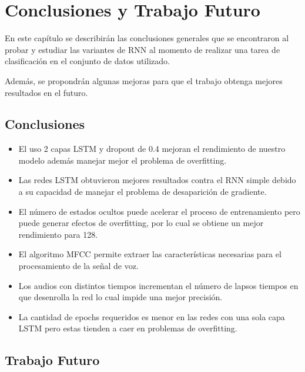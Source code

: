 \chapter{Conclusiones y Trabajo Futuro}
En este capítulo se describirán las conclusiones generales que se encontraron al probar y estudiar las variantes de RNN al momento de realizar una tarea de clasificación en el conjunto de datos utilizado.

Además, se propondrán algunas mejoras para que el trabajo obtenga mejores
resultados en el futuro.

\section{Conclusiones}

\begin{itemize}
	\item El uso 2 capas LSTM y dropout de 0.4 mejoran el rendimiento de nuestro modelo además manejar mejor el problema de overfitting.
	\item Las redes LSTM obtuvieron mejores resultados contra el RNN simple debido a su capacidad de manejar el problema de desaparición de gradiente.
	\item El número de estados ocultos puede acelerar el proceso de entrenamiento pero puede generar efectos de overfitting, por lo cual se obtiene un mejor rendimiento para 128.
	\item El algoritmo MFCC permite extraer las características necesarias para el procesamiento de la señal de voz.
	\item Los audios con distintos tiempos incrementan el número de lapsos tiempos en que desenrolla la red lo cual impide una mejor precisión.
	\item La cantidad de epochs requeridos es menor en las redes con una sola capa LSTM pero estas tienden a caer en problemas de overfitting.	
	
	
\end{itemize}

\section{Trabajo Futuro}

